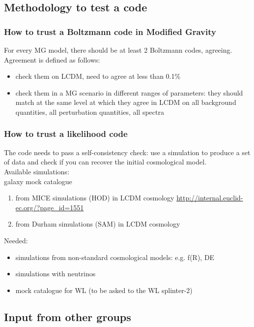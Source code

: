 \subsection{Methodology to test a code}

\subsubsection{How to trust a Boltzmann code in Modified Gravity}

For every MG model, there should be at least 2 Boltzmann codes, agreeing. Agreement is defined as follows: 
\begin{itemize}
 \item check them on LCDM, need to agree at less than 0.1\%
 \item check them in a MG scenario in different ranges of parameters: they should match at the same level at which they agree in LCDM on 
all background quantities, all perturbation quantities, all spectra
\end{itemize}

\subsubsection{How to trust a likelihood code}
The code needs to pass a self-consistency check: use a simulation to produce a set of data and check if you can recover the initial cosmological model.\\
Available simulations: \\
galaxy mock catalogue
\begin{enumerate}
 \item from MICE simulations (HOD) in LCDM cosmology  \url{http://internal.euclid-ec.org/?page_id=1551}
 \item from Durham simulations (SAM) in LCDM cosmology 
\end{enumerate}
Needed:
\begin{itemize}
 \item simulations from non-standard cosmological models: e.g. f(R), DE 
 \item simulations with neutrinos
 \item mock catalogue for WL (to be asked to the WL splinter-2)
\end{itemize}


\subsection{Input from other groups}
